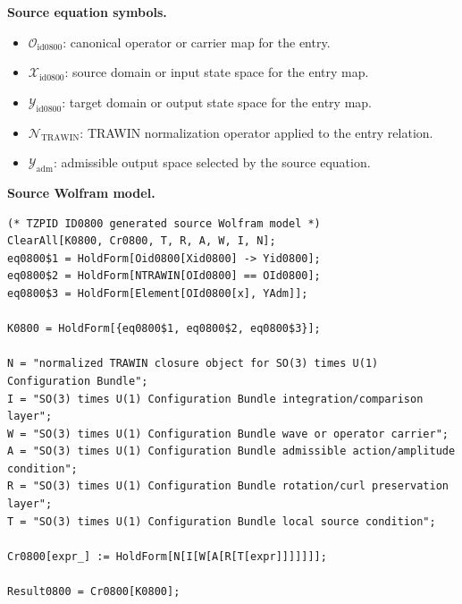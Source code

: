 \begin{minipage}[t]{0.49\linewidth}
\begingroup
\small
\raggedright
\textbf{Source equation symbols.}\par
\begin{itemize}[leftmargin=1.35em,itemsep=1pt,topsep=1pt,parsep=0pt]
    \item $\mathcal{O}_{\mathrm{id0800}}$: canonical operator or carrier map for the entry.
    \item $\mathcal{X}_{\mathrm{id0800}}$: source domain or input state space for the entry map.
    \item $\mathcal{Y}_{\mathrm{id0800}}$: target domain or output state space for the entry map.
    \item $\mathcal{N}_{\mathrm{TRAWIN}}$: TRAWIN normalization operator applied to the entry relation.
    \item $\mathcal{Y}_{\mathrm{adm}}$: admissible output space selected by the source equation.
\end{itemize}
\endgroup
\end{minipage}\hfill
\begin{minipage}[t]{0.47\linewidth}
\begingroup
\scriptsize
\raggedright
\textbf{Source Wolfram model.}\par
\begin{Verbatim}[fontsize=\tiny,breaklines=true,breakanywhere=true]
(* TZPID ID0800 generated source Wolfram model *)
ClearAll[K0800, Cr0800, T, R, A, W, I, N];
eq0800$1 = HoldForm[Oid0800[Xid0800] -> Yid0800];
eq0800$2 = HoldForm[NTRAWIN[OId0800] == OId0800];
eq0800$3 = HoldForm[Element[OId0800[x], YAdm]];

K0800 = HoldForm[{eq0800$1, eq0800$2, eq0800$3}];

N = "normalized TRAWIN closure object for SO(3) times U(1) Configuration Bundle";
I = "SO(3) times U(1) Configuration Bundle integration/comparison layer";
W = "SO(3) times U(1) Configuration Bundle wave or operator carrier";
A = "SO(3) times U(1) Configuration Bundle admissible action/amplitude condition";
R = "SO(3) times U(1) Configuration Bundle rotation/curl preservation layer";
T = "SO(3) times U(1) Configuration Bundle local source condition";

Cr0800[expr_] := HoldForm[N[I[W[A[R[T[expr]]]]]]];

Result0800 = Cr0800[K0800];
\end{Verbatim}
\endgroup
\end{minipage}

